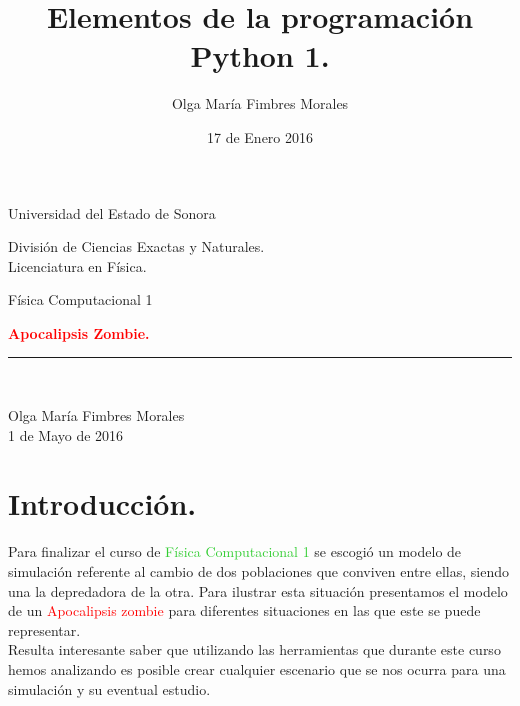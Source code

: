 \documentclass[12pt]{article}
\title{Elementos de la programación Python 1.}
\author{\textcolor{JungleGreen}{Olga María Fimbres Morales}}
\date{17 de Enero 2016}
\begin{document}
\begin{titlepage}
\pagecolor{black!85}
\color{white}
\begin{center}
\begin{large}
Universidad del Estado de Sonora\\
\end{large}
\vspace*{0.15in}
División de Ciencias Exactas y Naturales.\\
\vspace*{0.15in}
Licenciatura en Física. \\
\vspace*{0.6in}
\begin{large}
Física Computacional 1\\
\end{large}
\vspace*{0.2in}
\begin{Large}
\Huge{\textbf{{\textcolor{Red}{Apocalipsis Zombie.}}}} \\
\end{Large}


\rule{80mm}{0.1mm}\\
\vspace*{0.1in}
\begin{large}
{Olga María Fimbres Morales}\\
1 de Mayo de 2016\\
\end{large}
\end{center}
\end{titlepage}

\pagebreak
\color{white}
\section*{Introducción.}
 Para finalizar el curso de \textcolor{LimeGreen}{Física Computacional 1} se escogió un modelo de simulación referente al cambio de dos poblaciones que conviven entre ellas, siendo una la depredadora de la otra. Para ilustrar esta situación presentamos el modelo de un \textcolor{Red}{Apocalipsis zombie} para diferentes situaciones en las que este se puede representar.\\
 
 Resulta interesante saber que utilizando las herramientas que durante este curso hemos analizando es posible crear cualquier escenario que se nos ocurra para una simulación y su eventual estudio.\\
 
\end{document}
